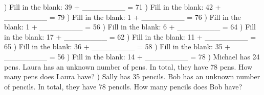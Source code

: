 \documentclass{article}%
\begin{document}
) Fill in the blank: 39 + \_\_\_\_\_\_\_\_ = 71%
\newline%
\newline%
) Fill in the blank: 42 + \_\_\_\_\_\_\_\_ = 79%
\newline%
\newline%
) Fill in the blank: 1 + \_\_\_\_\_\_\_\_ = 76%
\newline%
\newline%
) Fill in the blank: 1 + \_\_\_\_\_\_\_\_ = 56%
\newline%
\newline%
) Fill in the blank: 6 + \_\_\_\_\_\_\_\_ = 64%
\newline%
\newline%
) Fill in the blank: 17 + \_\_\_\_\_\_\_\_ = 62%
\newline%
\newline%
) Fill in the blank: 11 + \_\_\_\_\_\_\_\_ = 65%
\newline%
\newline%
) Fill in the blank: 36 + \_\_\_\_\_\_\_\_ = 58%
\newline%
\newline%
) Fill in the blank: 35 + \_\_\_\_\_\_\_\_ = 56%
\newline%
\newline%
) Fill in the blank: 14 + \_\_\_\_\_\_\_\_ = 78%
\newline%
\newline%
) Michael has 24 pens. Laura has an unknown number of pens. In total, they have 78 pens. How many pens does Laura have?%
\newline%
\newline%
) Sally has 35 pencils. Bob has an unknown number of pencils. In total, they have 78 pencils. How many pencils does Bob have?%
\newline%
\newline%
\newline%
\end{document}
